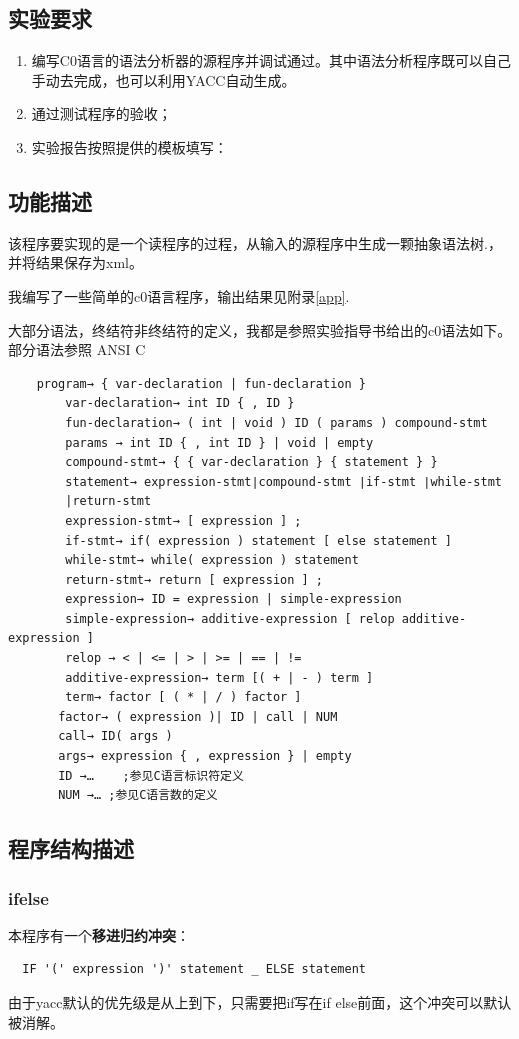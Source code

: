 \documentclass{article}
\begin{document}
\begin{CJK}{UTF8}{gkai}
\subsection{实验要求}
\begin{enumerate}
\item 编写C0语言的语法分析器的源程序并调试通过。其中语法分析程序既可以自己手动去完成，也可以利用YACC自动生成。
\item 通过测试程序的验收； 
\item 实验报告按照提供的模板填写：
\end{enumerate}

\subsection{功能描述}
该程序要实现的是一个读程序的过程，从输入的源程序中生成一颗抽象语法树\cite{chen2000}\cite{appel2004modern}\cite{louden2000}\cite{appel2006}.，并将结果保存为xml。

我编写了一些简单的c0语言程序，输出结果见附录\ref{app}.

大部分语法，终结符非终结符的定义，我都是参照实验指导书给出的c0语法如下。部分语法参照 ANSI C \cite{ansic}
\begin{verbatim}
    program→ { var-declaration | fun-declaration }
        var-declaration→ int ID { , ID }    
        fun-declaration→ ( int | void ) ID ( params ) compound-stmt
        params → int ID { , int ID } | void | empty
        compound-stmt→ { { var-declaration } { statement } }
        statement→ expression-stmt∣compound-stmt ∣if-stmt ∣while-stmt 
        |return-stmt 
        expression-stmt→ [ expression ] ; 
        if-stmt→ if( expression ) statement [ else statement ]
        while-stmt→ while( expression ) statement 
        return-stmt→ return [ expression ] ;
        expression→ ID = expression | simple-expression
        simple-expression→ additive-expression [ relop additive-expression ]
        relop → < | <= | > | >= | == | != 
        additive-expression→ term [( + | - ) term ]
        term→ factor [ ( * | / ) factor ]
       factor→ ( expression )| ID | call | NUM
       call→ ID( args ) 
       args→ expression { , expression } | empty
       ID →…	;参见C语言标识符定义
       NUM →… ;参见C语言数的定义
\end{verbatim}
\subsection{程序结构描述}
\subsubsection{ifelse}
本程序有一个\textbf{移进归约冲突}：
\begin{verbatim}
  IF '(' expression ')' statement _ ELSE statement
\end{verbatim}
由于yacc默认的优先级是从上到下，只需要把if写在if else前面，这个冲突可以默认被消解。

\end{CJK}
\end{document}
